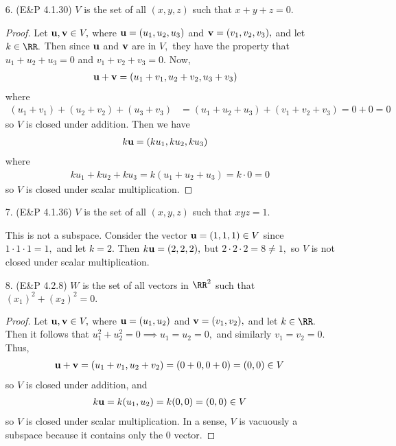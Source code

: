 \documentclass{article}
\newcommand{\vu}{{\bf u}}
\newcommand{\vv}{{\bf v}}
\begin{document}
\begin{itemize}
	\item[6.] (E\&P 4.1.30) $V$ is the set of all $(x, y, z)$ such that $x+y+z=0.$
		\begin{proof}
			Let $\vu, \vv\in V,$ where $\vu = (u_1, u_2, u_3)$ and $\vv=(v_1, v_2, v_3),$ and let $k\in\RR.$ Then since $\vu$ and $\vv$ are in $V,$ they have the property that $u_1+u_2+u_3=0$ and $v_1+v_2+v_3 = 0.$ Now,
			\begin{align*}
				\vu + \vv &= \left( u_1+v_1, u_2+v_2, u_3+v_3 \right)
			\end{align*}
			where
			\begin{align*}
				(u_1+v_1) + (u_2+v_2) + (u_3+v_3) &= (u_1+u_2+u_3) + (v_1+v_2+v_3) = 0 + 0 = 0
			\end{align*}
			so $V$ is closed under addition. Then we have
			\begin{align*}
				k\vu &= (ku_1, ku_2, ku_3)
			\end{align*}
			where
			\begin{align*}
				ku_1 + ku_2 + ku_3 = k(u_1+u_2+u_3) = k\cdot 0 = 0
			\end{align*}
			so $V$ is closed under scalar multiplication.
		\end{proof}

		\newpage
	\item[7.] (E\&P 4.1.36) $V$ is the set of all $(x, y, z)$ such that $xyz=1.$
		\begin{soln}
			This is not a subspace. Consider the vector $\vu =(1, 1, 1)\in V$ since $1\cdot 1\cdot 1 = 1,$ and let $k=2.$ Then $k\vu = (2, 2, 2),$ but $2\cdot2\cdot 2=8\neq 1,$ so $V$ is not closed under scalar multiplication.
		\end{soln}

	\item[8.] (E\&P 4.2.8) $W$ is the set of all vectors in $\RR^2$ such that $(x_1)^2+(x_2)^2=0.$
		\begin{proof}
			Let $\vu, \vv\in V,$ where $\vu=(u_1, u_2)$ and $\vv=(v_1, v_2),$ and let $k\in\RR.$ Then it follows that $u_1^2+u_2^2=0\implies u_1=u_2=0,$ and similarly $v_1=v_2=0.$ Thus,
			\begin{align*}
				\vu+\vv = (u_1+v_1, u_2+v_2) = (0+0, 0+0) = (0, 0)\in V
			\end{align*}
			so $V$ is closed under addition, and
			\begin{align*}
				k\vu = k(u_1, u_2) = k(0, 0) = (0, 0)\in V
			\end{align*}
			so $V$ is closed under scalar multiplication. In a sense, $V$ is vacuously a subspace because it contains only the 0 vector.
		\end{proof}

\end{itemize}
\end{document}
